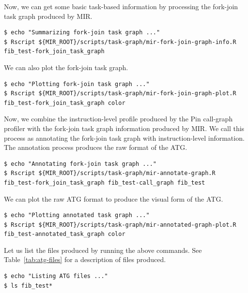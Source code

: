 \documentclass[11pt,a4paper,notitlepage]{article}
\begin{document}
Now, we can get some basic task-based information by processing the fork-join task graph produced by MIR.
\begin{lstlisting}[style=BashInputStyle]
$ echo "Summarizing fork-join task graph ..."
$ Rscript ${MIR_ROOT}/scripts/task-graph/mir-fork-join-graph-info.R fib_test-fork_join_task_graph 
\end{lstlisting}

We can also plot the fork-join task graph. 
\begin{lstlisting}[style=BashInputStyle]
$ echo "Plotting fork-join task graph ..."
$ Rscript ${MIR_ROOT}/scripts/task-graph/mir-fork-join-graph-plot.R fib_test-fork_join_task_graph color
\end{lstlisting}

Now, we combine the instruction-level profile produced by the Pin call-graph profiler with the fork-join task graph information produced by MIR. We call this process as annotating the fork-join task graph with instruction-level information. The annotation process produces the raw format of the ATG.

\begin{lstlisting}[style=BashInputStyle]
$ echo "Annotating fork-join task graph ..."
$ Rscript ${MIR_ROOT}/scripts/task-graph/mir-annotate-graph.R fib_test-fork_join_task_graph fib_test-call_graph fib_test
\end{lstlisting}

We can plot the raw ATG format to produce the visual form of the ATG.
\begin{lstlisting}[style=BashInputStyle]
$ echo "Plotting annotated task graph ..."
$ Rscript ${MIR_ROOT}/scripts/task-graph/mir-annotated-graph-plot.R fib_test-annotated_task_graph color
\end{lstlisting}

Let us list the files produced by running the above commands. See Table~\ref{tab:atg-files} for a description of files produced.
\begin{lstlisting}[style=BashInputStyle]
$ echo "Listing ATG files ..."
$ ls fib_test*
\end{lstlisting}
\end{document}
